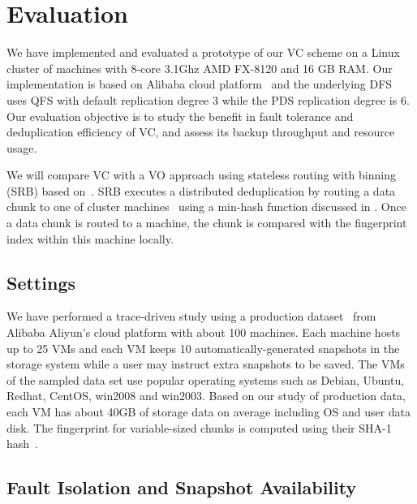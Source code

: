 \section{Evaluation}
\label{sect:evaluation}
We have implemented and evaluated a prototype of our VC scheme on a Linux cluster of machines with
8-core 3.1Ghz AMD FX-8120 and 16 GB RAM. 
Our implementation is based on Alibaba cloud platform~\cite{Aliyun,WeiZhangIEEE}
and the underlying DFS uses  QFS with default replication degree 3 while the PDS replication degree is 6.
Our evaluation objective is to
study the benefit in fault tolerance and   deduplication efficiency of VC,  
and assess its backup throughput and  resource usage. 

We will compare VC with a VO approach  using stateless routing with binning (SRB) 
based on~\cite{Dong2011,extreme_binning09}.
SRB executes a distributed deduplication by routing a data chunk to one of cluster machines~\cite{Dong2011}
using  a min-hash function discussed in \cite{extreme_binning09}. Once a data chunk is routed to
a machine, the chunk is compared with the fingerprint index within this machine locally. 

\subsection{Settings}
We have performed a trace-driven study using a production dataset~\cite{WeiZhangIEEE} from 
Alibaba Aliyun's cloud platform with about 100 machines. 
Each machine hosts up to 25 VMs and each VM keeps 10 automatically-generated snapshots in the storage system while
a user may instruct extra snapshots to be saved.
The VMs of the sampled data set use popular operating systems such as 
Debian, Ubuntu, Redhat, CentOS, win2008 and win2003. 
Based on our study of production  data,  each VM has about 40GB of storage  data  on average
including OS and user data disk.
The fingerprint for variable-sized chunks is computed using their SHA-1 hash~\cite{similar94,rabin81}. 

\subsection{Fault Isolation and Snapshot Availability}

